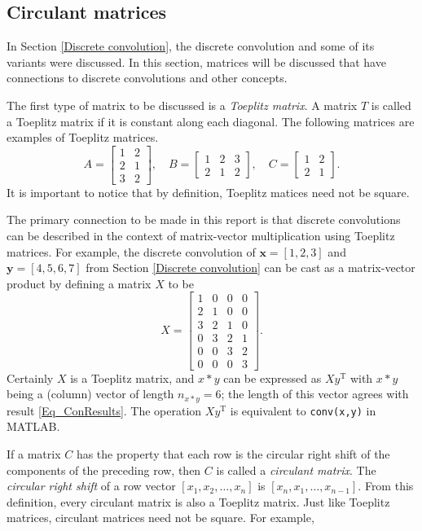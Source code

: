\documentclass[12pt]{article}
\newcommand{\trans}{\mathrm{T}}	%
\begin{document}
\subsection{Circulant matrices} \label{Circulant matrices}
In Section \ref{Discrete convolution}, the discrete convolution and some of its variants were discussed. In this section, matrices will be discussed that have connections to discrete convolutions and other concepts. \par 
The first type of matrix to be discussed is a \textit{Toeplitz matrix}. A matrix $T$ is called a Toeplitz matrix if it is constant along each diagonal. The following matrices are examples of Toeplitz matrices.
\[A = \begin{bmatrix}
1 & 2 \\
2 & 1 \\
3 & 2
\end{bmatrix}, \quad 
B = \begin{bmatrix}
1 & 2 & 3 \\
2 & 1 & 2 
\end{bmatrix}, \quad 
C = \begin{bmatrix}
1 &  2 \\
2 & 1
\end{bmatrix}.\]
It is important to notice that by definition, Toeplitz matices need not be square. \par 
The primary connection to be made in this report is that discrete convolutions can be described in the context of matrix-vector multiplication using Toeplitz matrices. For example, the discrete convolution of $\mathbf{x} = [1,2,3]$ and $\mathbf{y} = [4,5,6,7]$ from Section \ref{Discrete convolution} can be cast as a matrix-vector product by defining a matrix $X$ to be
\[X = \begin{bmatrix}
1 & 0 & 0 & 0 \\
2 & 1 & 0 & 0 \\
3 & 2 & 1 & 0 \\
0 & 3 & 2 & 1 \\
0 & 0 & 3 & 2 \\
0 & 0 & 0 & 3
\end{bmatrix}.\]
Certainly $X$ is a Toeplitz matrix, and $x*y$ can be expressed as $Xy^\trans$ with $x*y$ being a (column) vector of length $n_{x*y} = 6$; the length of this vector agrees with result \eqref{Eq_ConResults}. The operation $Xy^\trans$ is equivalent to \texttt{conv(x,y)} in MATLAB. \par 
If a matrix $C$ has the property that each row is the circular right shift of the components of the preceding row, then $C$ is called a \textit{circulant matrix}. The \textit{circular right shift} of a row vector $[x_1,x_2,\ldots,x_n]$ is $[x_n,x_1,\ldots,x_{n-1}]$. From this definition, every circulant matrix is also a Toeplitz matrix. Just like Toeplitz matrices, circulant matrices need not be square. For example,
\end{document}
